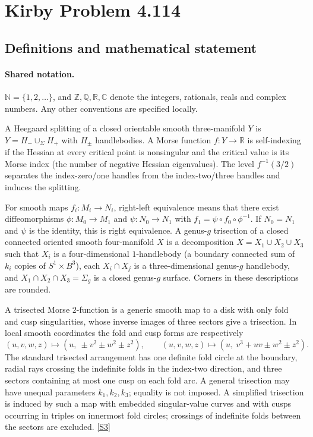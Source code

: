 \documentclass[11pt]{article}
\newcommand{\sref}[2]{\hyperlink{source:#1:#2}{[S#2]}}
\begin{document}
\section{Kirby Problem 4.114}\label{statement}

\subsection{Definitions and mathematical statement}

\paragraph{Shared notation.}$\mathbb N=\{1,2,\ldots\}$, and $\mathbb Z,\mathbb Q,\mathbb R,\mathbb C$ denote the integers, rationals, reals and complex numbers. Any other conventions are specified locally.


A Heegaard splitting of a closed orientable smooth three-manifold $Y$ is $Y=H_-\cup_\Sigma H_+$ with $H_\pm$ handlebodies. A Morse function $f:Y\to\mathbb R$ is self-indexing if the Hessian at every critical point is nonsingular and the critical value is its Morse index (the number of negative Hessian eigenvalues). The level $f^{-1}(3/2)$ separates the index-zero/one handles from the index-two/three handles and induces the splitting.

For smooth maps $f_i:M_i\to N_i$, right-left equivalence means that there exist diffeomorphisms $\phi:M_0\to M_1$ and $\psi:N_0\to N_1$ with $f_1=\psi\circ f_0\circ\phi^{-1}$. If $N_0=N_1$ and $\psi$ is the identity, this is right equivalence.
A genus-$g$ trisection of a closed connected oriented smooth four-manifold $X$ is a decomposition $X=X_1\cup X_2\cup X_3$ such that $X_i$ is a four-dimensional $1$-handlebody (a boundary connected sum of $k_i$ copies of $S^1\times B^3$), each $X_i\cap X_j$ is a three-dimensional genus-$g$ handlebody, and $X_1\cap X_2\cap X_3=\Sigma_g$ is a closed genus-$g$ surface. Corners in these descriptions are rounded.

A trisected Morse $2$-function is a generic smooth map to a disk with only fold and cusp singularities, whose inverse images of three sectors give a trisection. In local smooth coordinates the fold and cusp forms are respectively
\[
 (u,v,w,z)\mapsto(u,\ \pm v^2\pm w^2\pm z^2),\qquad
 (u,v,w,z)\mapsto(u,\ v^3+uv\pm w^2\pm z^2).
\]
The standard trisected arrangement has one definite fold circle at the boundary, radial rays crossing the indefinite folds in the index-two direction, and three sectors containing at most one cusp on each fold arc. A general trisection may have unequal parameters $k_1,k_2,k_3$; equality is not imposed. A simplified trisection is induced by such a map with embedded singular-value curves and with cusps occurring in triples on innermost fold circles; crossings of indefinite folds between the sectors are excluded. \sref{statement}{3}
\end{document}
